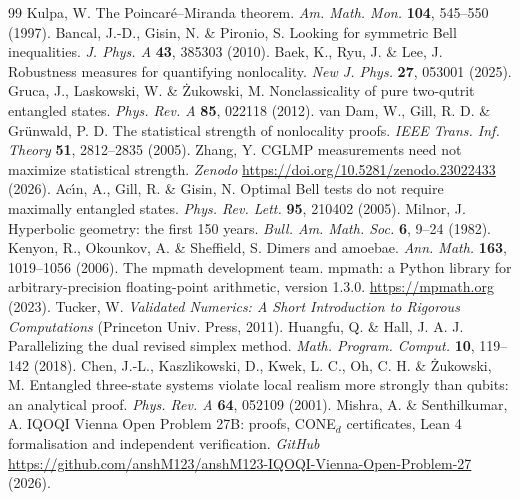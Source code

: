 \begin{thebibliography}{99}
 Kulpa, W. The Poincar\'{e}--Miranda theorem. \textit{Am. Math. Mon.} \textbf{104}, 545--550 (1997).
 Bancal, J.-D., Gisin, N. \& Pironio, S. Looking for symmetric Bell inequalities. \textit{J. Phys. A} \textbf{43}, 385303 (2010).
 Baek, K., Ryu, J. \& Lee, J. Robustness measures for quantifying nonlocality. \textit{New J. Phys.} \textbf{27}, 053001 (2025).
 Gruca, J., Laskowski, W. \& \.{Z}ukowski, M. Nonclassicality of pure two-qutrit entangled states. \textit{Phys. Rev. A} \textbf{85}, 022118 (2012).
 van Dam, W., Gill, R. D. \& Gr\"{u}nwald, P. D. The statistical strength of nonlocality proofs. \textit{IEEE Trans. Inf. Theory} \textbf{51}, 2812--2835 (2005).
 Zhang, Y. CGLMP measurements need not maximize statistical strength. \textit{Zenodo} \url{https://doi.org/10.5281/zenodo.23022433} (2026).
 Ac\'{\i}n, A., Gill, R. \& Gisin, N. Optimal Bell tests do not require maximally entangled states. \textit{Phys. Rev. Lett.} \textbf{95}, 210402 (2005).
 Milnor, J. Hyperbolic geometry: the first 150 years. \textit{Bull. Am. Math. Soc.} \textbf{6}, 9--24 (1982).
 Kenyon, R., Okounkov, A. \& Sheffield, S. Dimers and amoebae. \textit{Ann. Math.} \textbf{163}, 1019--1056 (2006).
 The mpmath development team. mpmath: a Python library for arbitrary-precision floating-point arithmetic, version 1.3.0. \url{https://mpmath.org} (2023).
 Tucker, W. \textit{Validated Numerics: A Short Introduction to Rigorous Computations} (Princeton Univ. Press, 2011).
 Huangfu, Q. \& Hall, J. A. J. Parallelizing the dual revised simplex method. \textit{Math. Program. Comput.} \textbf{10}, 119--142 (2018).
 Chen, J.-L., Kaszlikowski, D., Kwek, L. C., Oh, C. H. \& \.{Z}ukowski, M. Entangled three-state systems violate local realism more strongly than qubits: an analytical proof. \textit{Phys. Rev. A} \textbf{64}, 052109 (2001).
 Mishra, A. \& Senthilkumar, A. IQOQI Vienna Open Problem 27B: proofs, CONE$_d$ certificates, Lean 4 formalisation and independent verification. \textit{GitHub} \url{https://github.com/anshM123/anshM123-IQOQI-Vienna-Open-Problem-27} (2026).
\end{thebibliography}
